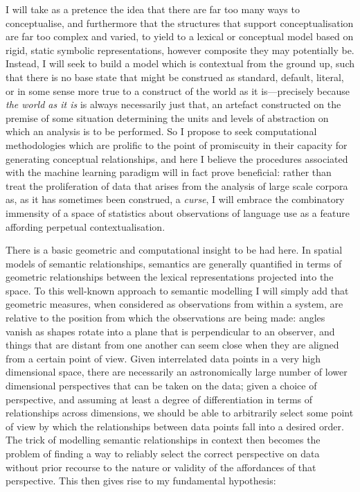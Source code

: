 I will take as a pretence the idea that there are far too many ways to conceptualise, and furthermore that the structures that support conceptualisation are far too complex and varied, to yield to a lexical or conceptual model based on rigid, static symbolic representations, however composite they may potentially be.  Instead, I will seek to build a model which is contextual from the ground up, such that there is no base state that might be construed as standard, default, literal, or in some sense more true to a construct of the world as it is---precisely because \emph{the world as it is} is always necessarily just that, an artefact constructed on the premise of some situation determining the units and levels of abstraction on which an analysis is to be performed.  So I propose to seek computational methodologies which are prolific to the point of promiscuity in their capacity for generating conceptual relationships, and here I believe the procedures associated with the machine learning paradigm will in fact prove beneficial: rather than treat the proliferation of data that arises from the analysis of large scale corpora as, as it has sometimes been construed, a \emph{curse}, I will embrace the combinatory immensity of a space of statistics about observations of language use as a feature affording perpetual contextualisation.

There is a basic geometric and computational insight to be had here.  In spatial models of semantic relationships, semantics are generally quantified in terms of geometric relationships between the lexical representations projected into the space.  To this well-known approach to semantic modelling I will simply add that geometric measures, when considered as observations from within a system, are relative to the position from which the observations are being made: angles vanish as shapes rotate into a plane that is perpendicular to an observer, and things that are distant from one another can seem close when they are aligned from a certain point of view.  Given interrelated data points in a very high dimensional space, there are necessarily an astronomically large number of lower dimensional perspectives that can be taken on the data; given a choice of perspective, and assuming at least a degree of differentiation in terms of relationships across dimensions, we should be able to arbitrarily select some point of view by which the relationships between data points fall into a desired order.  The trick of modelling semantic relationships in context then becomes the problem of finding a way to reliably select the correct perspective on data without prior recourse to the nature or validity of the affordances of that perspective.  This then gives rise to my fundamental hypothesis:

